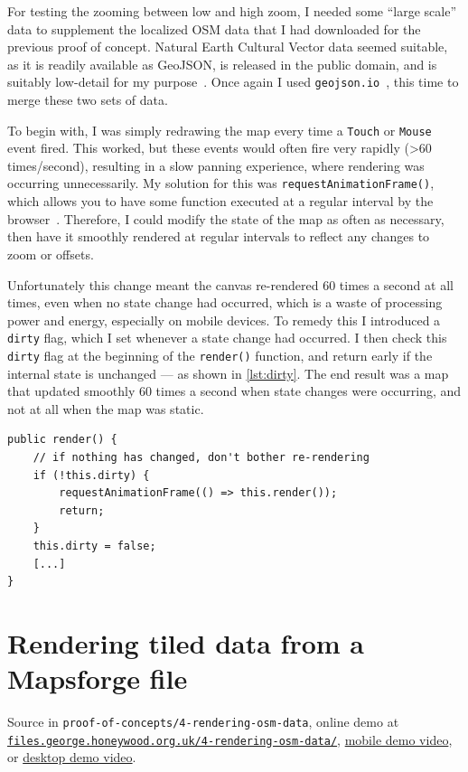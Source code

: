 \documentclass{final_report}
\begin{document}
For testing the zooming between low and high zoom, I needed some ``large scale'' data to supplement the localized OSM data that I had downloaded for the previous proof of concept. Natural Earth Cultural Vector data seemed suitable, as it is readily available as GeoJSON, is released in the public domain, and is suitably low-detail for my purpose~\cite{natural-earth}. Once again I used \texttt{geojson.io}~\cite{geojson.io}, this time to merge these two sets of data.

To begin with, I was simply redrawing the map every time a \texttt{Touch} or \texttt{Mouse} event fired. This worked, but these events would often fire very rapidly (>60 times/second), resulting in a slow panning experience, where rendering was occurring unnecessarily. My solution for this was \texttt{requestAnimationFrame()}, which allows you to have some function executed at a regular interval by the browser~\cite{mdn-request-animation-frame}. Therefore, I could modify the state of the map as often as necessary, then have it smoothly rendered at regular intervals to reflect any changes to zoom or offsets.

Unfortunately this change meant the canvas re-rendered 60 times a second at all times, even when no state change had occurred, which is a waste of processing power and energy, especially on mobile devices. To remedy this I introduced a \texttt{dirty} flag, which I set whenever a state change had occurred. I then check this \texttt{dirty} flag at the beginning of the \texttt{render()} function, and return early if the internal state is unchanged --- as shown in \autoref{lst:dirty}. The end result was a map that updated smoothly 60 times a second when state changes were occurring, and not at all when the map was static.

\begin{lstlisting}[caption=Only rendering when the map state is \texttt{dirty}, label=lst:dirty]
public render() {
    // if nothing has changed, don't bother re-rendering
    if (!this.dirty) {
        requestAnimationFrame(() => this.render());
        return;
    }
    this.dirty = false;
    [...]
}
\end{lstlisting}

\section{Rendering tiled data from a Mapsforge file}

{ \footnotesize Source in \texttt{proof-of-concepts/4-rendering-osm-data}, online demo at \href{https://files.george.honeywood.org.uk/4-rendering-osm-data/#15/50.7895/-1.8938}{\nolinkurl{files.george.honeywood.org.uk/4-rendering-osm-data/}}, \href{https://youtu.be/2cvZ-veBUto}{mobile demo video}, or \href{https://youtu.be/0evN3RT42QQ}{desktop demo video}.}
\end{document}
